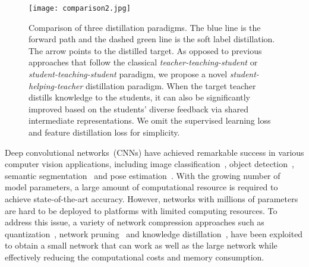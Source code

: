 \documentclass[letterpaper]{article} %
\begin{document}

\begin{figure}[t]
	\centering
	\texttt{[image: comparison2.jpg]}
	\caption{
		Comparison of three distillation paradigms. The blue line is the forward path and the dashed green line is the soft label distillation. The arrow points to the distilled target. As opposed to previous approaches that follow the classical \textit{teacher-teaching-student} or \textit{student-teaching-student} paradigm, we propose a novel \textit{student-helping-teacher} distillation paradigm. When the target teacher distills knowledge to the students, it can also be significantly improved based on the students' diverse feedback via shared intermediate representations.
		We omit the supervised learning loss and feature distillation loss for simplicity.
	}
	\label{fig:comparison}
\end{figure}


Deep convolutional networks~(CNNs) have achieved remarkable success in various computer vision applications, including image classification~\cite{he2016deep,huang2017densely,xie2017aggregated,li2019selective}, object detection~\cite{girshick2015fast,ren2015faster,tian2019fcos,li2020generalized,li2021generalized}, semantic segmentation~\cite{long2015fully,ronneberger2015u} and pose estimation~\cite{newell2016stacked,chu2017multi}. With the growing number of model parameters, a large amount of computational resource is required to achieve state-of-the-art accuracy. However, networks with millions of parameters are hard to be deployed to platforms with limited computing resources. To address this issue, a variety of network compression approaches such as quantization~\cite{chen2015compressing,wu2016quantized}, network pruning~\cite{molchanov2016pruning,li2016pruning} and knowledge distillation~\cite{hinton2015distilling}, have been exploited to obtain a small network that can work as well as the large network while effectively reducing the computational costs and memory consumption.
\end{document}
